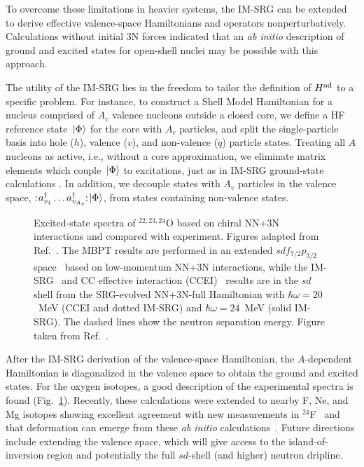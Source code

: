 To overcome these limitations in heavier systems, the IM-SRG can be
extended to derive effective valence-space Hamiltonians and operators
nonperturbatively.  Calculations without initial 3N forces
\cite{Tsukiyama:2012fk} indicated that an \emph{ab initio} description
of ground and excited states for open-shell nuclei may be possible
with this approach.

The utility of the IM-SRG lies in the freedom to tailor the definition
of $H^{\rm{od}}$ to a specific problem.  For instance, to construct a
Shell Model Hamiltonian for a nucleus comprised of $A_v$ valence
nucleons outside a closed core, we define a HF reference state
$\,|{\Phi}\rangle$ for the core with $A_c$ particles, and split the
single-particle basis into hole ($h$), valence ($v$), and non-valence
($q$) particle states.  Treating all $A$ nucleons as active, i.e.,
without a core approximation, we eliminate matrix elements which
couple $\,|{\Phi}\rangle$ to excitations, just as in IM-SRG ground-state
calculations \cite{Tsukiyama:2011uq,Hergert:2013mi,Hergert:2013ij}. In
addition, we decouple states with $A_v$ particles in the valence
space, \mbox{$:\!a^\dag_{v_1}\ldots a^\dag_{v_{A_v}}\!\!:\!\!\,|{\Phi}\rangle$},
from states containing non-valence states.

\begin{figure}[t]
\begin{center}
\end{center}
\caption{Excited-state spectra of $^{22,23,24}$O based on chiral NN+3N
interactions and compared with experiment. Figures adapted from
Ref.~\cite{Bogner:2014tg}. The MBPT results are performed in an extended
$sdf_{7/2}p_{3/2}$ space~\cite{Holt:2013fk} based on low-momentum NN+3N
interactions, while the IM-SRG~\cite{Bogner:2014tg} and CC effective
interaction (CCEI)~\cite{Jansen:2014qf} results are in the $sd$ shell from
the SRG-evolved NN+3N-full Hamiltonian with $\hbar \omega=20$~MeV
(CCEI and dotted IM-SRG) and $\hbar \omega=24$~MeV (solid IM-SRG). The
dashed lines show the neutron separation energy.
Figure taken from Ref.~\cite{Hebeler:2015xq}.\label{fig:Ospectra}}
\end{figure}

After the IM-SRG derivation of the valence-space Hamiltonian, the
$A$-dependent Hamiltonian is diagonalized in the valence space to
obtain the ground and excited states. For the oxygen isotopes, a good
description of the experimental spectra is found
(Fig.~\ref{fig:Ospectra}).  Recently, these calculations were extended
to nearby F, Ne, and Mg isotopes showing excellent agreement with new
measurements in $^{24}$F~\cite{Caceres:2015fk} and that deformation
can emerge from these \emph{ab initio}
calculations~\cite{Stroberg:2015qr}. Future directions include
extending the valence space, which will give access to the
island-of-inversion region and potentially the full $sd$-shell (and
higher) neutron dripline.



